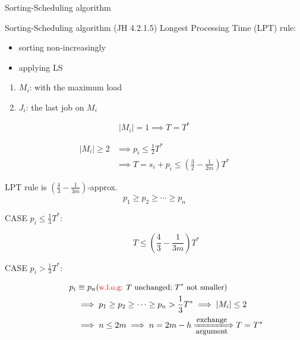 \begin{frame}{Sorting-Scheduling algorithm}
  \begin{exampleblock}{Sorting-Scheduling algorithm (JH 4.2.1.5)}
	Longest Processing Time (LPT) rule:
	\begin{itemize}
	  \item sorting non-increasingly
	  \item applying LS
	\end{itemize}
  \end{exampleblock}

  \begin{enumerate}
	\item $M_i$: with the maximum load
	\item $J_i$: the last job on $M_i$
  \end{enumerate}

  \[
	|M_i| = 1 \implies T = T^{\ast}
  \]

  \begin{align*}
	|M_i| \ge 2 &\implies p_i \le \frac{1}{2} T^{\ast} \\
	& \implies T = s_i + p_i \le (\frac{3}{2} - \frac{1}{2m}) T^{\ast}
  \end{align*}
\end{frame}
\begin{frame}{LPT rule is $(\frac{4}{3} - \frac{1}{3m})$-approx.}
  \[
	p_1 \ge p_2 \ge \cdots \ge p_n
  \]

  \begin{description}
	\item[CASE $p_i \le \frac{1}{3} T^{\ast}$:] 
	  \[
		T \le (\frac{4}{3} - \frac{1}{3m}) T^{\ast}
	  \]
	\item[CASE $p_i > \frac{1}{3} T^{\ast}$:]
	  \begin{align*}
		p_i &\equiv p_n \text{\small (\textcolor{red}{w.l.o.g}: $T$ unchanged; $T^{\ast}$ not smaller)} \\
		&\implies p_1 \ge p_2 \ge \cdots \ge p_n > \frac{1}{3} T^{\ast} \implies |M_i| \le 2 \\
		&\implies n \le 2m \implies n = 2m - h \xLongrightarrow[\text{\small argument}]{\text{\small exchange}} T = T^{\ast}
	  \end{align*}
  \end{description}
\end{frame}
